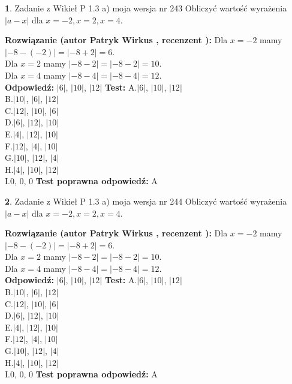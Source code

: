\documentclass[12pt, a4paper]{article}
\theoremstyle{definition} %
\newtheorem{zad}{}
\newcommand{\zadStart}[1]{\begin{zad}#1\newline}
\newcommand{\zadStop}{\end{zad}}
\newcommand{\rozwStart}[2]{\noindent \textbf{Rozwiązanie (autor #1 , recenzent #2): }\newline}
\newcommand{\rozwStop}{\newline}
\newcommand{\odpStart}{\noindent \textbf{Odpowiedź:}\newline}
\newcommand{\odpStop}{\newline}
\newcommand{\testStart}{\noindent \textbf{Test:}\newline}
\newcommand{\testStop}{\newline}
\newcommand{\kluczStart}{\noindent \textbf{Test poprawna odpowiedź:}\newline}
\newcommand{\kluczStop}{\newline}
\begin{document}
\zadStart{Zadanie z Wikieł P 1.3 a) moja wersja nr 243}
Obliczyć wartość wyrażenia $|a - x|$ dla $x=-2,x=2,x=4$.
\zadStop
\rozwStart{Patryk Wirkus}{}
Dla $x = -2$ mamy $|-8 - (-2)| = |-8 + 2| = 6$.\\
Dla $x = 2$ mamy $|-8 - 2| = |-8 - 2| = 10$.\\
Dla $x = 4$ mamy $|-8 - 4| = |-8 - 4| = 12$.\\
\rozwStop
\odpStart
$|6|$, $|10|$, $|12|$
\odpStop
\testStart
A.$|6|$, $|10|$, $|12|$\\
B.$|10|$, $|6|$, $|12|$\\
C.$|12|$, $|10|$, $|6|$\\
D.$|6|$, $|12|$, $|10|$\\
E.$|4|$, $|12|$, $|10|$\\
F.$|12|$, $|4|$, $|10|$\\
G.$|10|$, $|12|$, $|4|$\\
H.$|4|$, $|10|$, $|12|$\\
I.$0$, $0$, $0$
\testStop
\kluczStart
A
\kluczStop



\zadStart{Zadanie z Wikieł P 1.3 a) moja wersja nr 244}
Obliczyć wartość wyrażenia $|a - x|$ dla $x=-2,x=2,x=4$.
\zadStop
\rozwStart{Patryk Wirkus}{}
Dla $x = -2$ mamy $|-8 - (-2)| = |-8 + 2| = 6$.\\
Dla $x = 2$ mamy $|-8 - 2| = |-8 - 2| = 10$.\\
Dla $x = 4$ mamy $|-8 - 4| = |-8 - 4| = 12$.\\
\rozwStop
\odpStart
$|6|$, $|10|$, $|12|$
\odpStop
\testStart
A.$|6|$, $|10|$, $|12|$\\
B.$|10|$, $|6|$, $|12|$\\
C.$|12|$, $|10|$, $|6|$\\
D.$|6|$, $|12|$, $|10|$\\
E.$|4|$, $|12|$, $|10|$\\
F.$|12|$, $|4|$, $|10|$\\
G.$|10|$, $|12|$, $|4|$\\
H.$|4|$, $|10|$, $|12|$\\
I.$0$, $0$, $0$
\testStop
\kluczStart
A
\kluczStop
\end{document}
